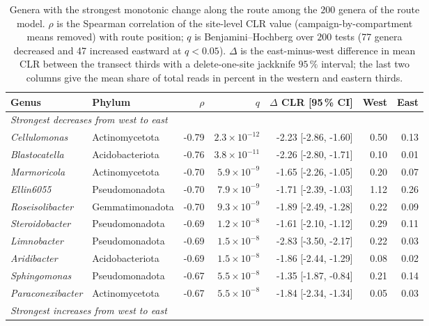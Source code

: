 \begin{table}[htbp]
\centering\footnotesize
\caption{Genera with the strongest monotonic change along the route among the $200$ genera of the route model. $\rho$ is the Spearman correlation of the site-level CLR value (campaign-by-compartment means removed) with route position; $q$ is Benjamini--Hochberg over $200$ tests (77 genera decreased and 47 increased eastward at $q<0.05$). $\Delta$ is the east-minus-west difference in mean CLR between the transect thirds with a delete-one-site jackknife $95\,\%$ interval; the last two columns give the mean share of total reads in percent in the western and eastern thirds.}
\label{tab:taxa_replacement}
\begin{tabular}{llrrrrr}
\toprule
Genus & Phylum & $\rho$ & $q$ & $\Delta$ CLR [95\,\% CI] & West & East \\
\midrule
\multicolumn{7}{l}{\emph{Strongest decreases from west to east}} \\
\textit{Cellulomonas} & Actinomycetota & -0.79 & $2.3\times10^{-12}$ & -2.23 [-2.86, -1.60] & 0.50 & 0.13 \\
\textit{Blastocatella} & Acidobacteriota & -0.76 & $3.8\times10^{-11}$ & -2.26 [-2.80, -1.71] & 0.10 & 0.01 \\
\textit{Marmoricola} & Actinomycetota & -0.70 & $5.9\times10^{-9}$ & -1.65 [-2.26, -1.05] & 0.20 & 0.07 \\
\textit{Ellin6055} & Pseudomonadota & -0.70 & $7.9\times10^{-9}$ & -1.71 [-2.39, -1.03] & 1.12 & 0.26 \\
\textit{Roseisolibacter} & Gemmatimonadota & -0.70 & $9.3\times10^{-9}$ & -1.89 [-2.49, -1.28] & 0.22 & 0.09 \\
\textit{Steroidobacter} & Pseudomonadota & -0.69 & $1.2\times10^{-8}$ & -1.61 [-2.10, -1.12] & 0.29 & 0.11 \\
\textit{Limnobacter} & Pseudomonadota & -0.69 & $1.5\times10^{-8}$ & -2.83 [-3.50, -2.17] & 0.22 & 0.03 \\
\textit{Aridibacter} & Acidobacteriota & -0.69 & $1.5\times10^{-8}$ & -1.86 [-2.44, -1.29] & 0.08 & 0.02 \\
\textit{Sphingomonas} & Pseudomonadota & -0.67 & $5.5\times10^{-8}$ & -1.35 [-1.87, -0.84] & 0.21 & 0.14 \\
\textit{Paraconexibacter} & Actinomycetota & -0.67 & $5.5\times10^{-8}$ & -1.84 [-2.34, -1.34] & 0.05 & 0.03 \\
\midrule
\multicolumn{7}{l}{\emph{Strongest increases from west to east}} \\

\end{tabular}
\end{table}

